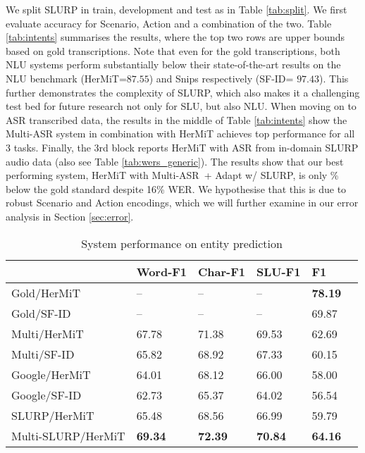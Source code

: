 \documentclass[11pt,a4paper]{article}
\newcommand{\metricname}{SLU-F1}
\newcommand{\levm}{Char-F1}
\newcommand{\datasetacr}{SLURP}
\newcommand{\hermit}{HerMiT}
\newcommand{\sfid}{SF-ID}
\newcommand{\masr}{Multi-ASR}
\begin{document}
We split SLURP in train, development and test as in Table \ref{tab:split}.
We first evaluate accuracy for Scenario, Action and a combination of the two.
Table \ref{tab:intents} summarises the results, where the top two rows are upper bounds based on gold transcriptions.  
Note that even for the gold transcriptions, both NLU systems perform substantially below their state-of-the-art results on the NLU benchmark (\hermit=$87.55$) and Snips respectively (\sfid = $97.43$). This further demonstrates the complexity of \datasetacr, which also makes it a challenging test bed for future research not only for SLU, but also NLU.
When moving on to ASR transcribed data, the results in the middle of Table \ref{tab:intents}
 show the \masr{} system in combination with \hermit{} achieves top performance for all 3 tasks. Finally, the 3rd block reports  \hermit{} with ASR from in-domain SLURP audio data (also see Table \ref{tab:wers_generic}).
 The results show that our best performing system, \hermit{} with
 \masr~+ Adapt w/ \datasetacr, is only \% below the gold standard despite 16\% WER.
We hypothesise that this is due to robust Scenario and Action encodings, which we will further examine in our error analysis in Section \ref{sec:error}.




\begin{table}[t]
	\centering
	\footnotesize
\begin{tabular}{l|p{0.8cm}p{0.8cm}p{0.8cm}p{0.8cm}p{0.8cm}}
	\toprule
	& \textbf{Word-F1} & \textbf{\levm} & \textbf{\metricname} & \textbf{F1} \\
	\midrule
	Gold/\hermit & -- & --  & -- & {\bf 78.19} \\
	Gold/\sfid & -- & -- & -- & 69.87 \\
	\midrule
    Multi/\hermit & 67.78 & 71.38 & 69.53 & 62.69 \\
    Multi/\sfid & 65.82 & 68.92 & 67.33  & 60.15 \\
    Google/\hermit & 64.01 & 68.12 & 66.00 & 58.00\\
    Google/\sfid & 62.73 & 65.37 & 64.02 & 56.54\\
    \midrule SLURP/\hermit & 65.48 & 68.56 & 66.99 & 59.79 \\
    {\scriptsize Multi-SLURP/\hermit} & \bf 69.34 &  \bf 72.39 & \bf 70.84 &  \bf 64.16 \\
    \bottomrule
\end{tabular}
	\caption{System performance on entity prediction} \label{tab:entities}
\end{table}
\end{document}
